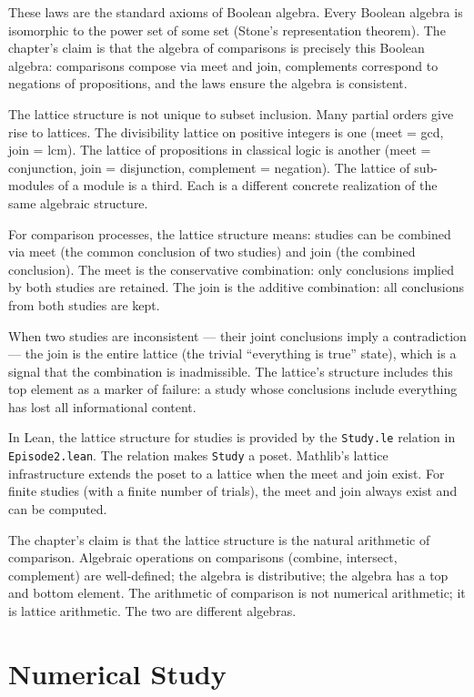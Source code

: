 These laws are the standard axioms of Boolean algebra. Every Boolean
algebra is isomorphic to the power set of some set (Stone's
representation theorem). The chapter's claim is that the algebra of
comparisons is precisely this Boolean algebra: comparisons compose
via meet and join, complements correspond to negations of
propositions, and the laws ensure the algebra is consistent.

The lattice structure is not unique to subset inclusion. Many
partial orders give rise to lattices. The divisibility lattice on
positive integers is one (meet = gcd, join = lcm). The lattice of
propositions in classical logic is another (meet = conjunction,
join = disjunction, complement = negation). The lattice of
sub-modules of a module is a third. Each is a different concrete
realization of the same algebraic structure.

For comparison processes, the lattice structure means: studies can
be combined via meet (the common conclusion of two studies) and
join (the combined conclusion). The meet is the conservative
combination: only conclusions implied by both studies are
retained. The join is the additive combination: all conclusions
from both studies are kept.

When two studies are inconsistent --- their joint conclusions imply
a contradiction --- the join is the entire lattice (the trivial
``everything is true'' state), which is a signal that the
combination is inadmissible. The lattice's structure includes
this top element as a marker of failure: a study whose conclusions
include everything has lost all informational content.

In Lean, the lattice structure for studies is provided by the
\texttt{Study.le} relation in \texttt{Episode2.lean}. The relation
makes \texttt{Study} a poset. Mathlib's lattice infrastructure
extends the poset to a lattice when the meet and join exist. For
finite studies (with a finite number of trials), the meet and join
always exist and can be computed.

The chapter's claim is that the lattice structure is the natural
arithmetic of comparison. Algebraic operations on comparisons
(combine, intersect, complement) are well-defined; the algebra is
distributive; the algebra has a top and bottom element. The
arithmetic of comparison is not numerical arithmetic; it is
lattice arithmetic. The two are different algebras.

\section{Numerical Study}
\label{se:numerical-study}

